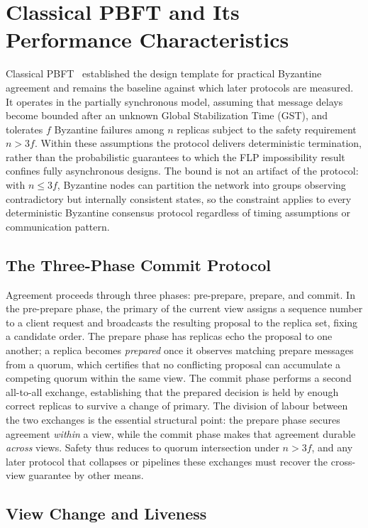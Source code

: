 \section{Classical PBFT and Its Performance Characteristics}

Classical PBFT~\cite{castro1999practical} established the design template for practical Byzantine agreement and remains the baseline against which later protocols are measured. It operates in the partially synchronous model, assuming that message delays become bounded after an unknown Global Stabilization Time (GST), and tolerates $f$ Byzantine failures among $n$ replicas subject to the safety requirement $n > 3f$. Within these assumptions the protocol delivers deterministic termination, rather than the probabilistic guarantees to which the FLP impossibility result confines fully asynchronous designs. The bound is not an artifact of the protocol: with $n \leq 3f$, Byzantine nodes can partition the network into groups observing contradictory but internally consistent states, so the constraint applies to every deterministic Byzantine consensus protocol regardless of timing assumptions or communication pattern.

\subsection{The Three-Phase Commit Protocol}

Agreement proceeds through three phases: pre-prepare, prepare, and commit. In the pre-prepare phase, the primary of the current view assigns a sequence number to a client request and broadcasts the resulting proposal to the replica set, fixing a candidate order. The prepare phase has replicas echo the proposal to one another; a replica becomes \emph{prepared} once it observes matching prepare messages from a quorum, which certifies that no conflicting proposal can accumulate a competing quorum within the same view. The commit phase performs a second all-to-all exchange, establishing that the prepared decision is held by enough correct replicas to survive a change of primary. The division of labour between the two exchanges is the essential structural point: the prepare phase secures agreement \emph{within} a view, while the commit phase makes that agreement durable \emph{across} views. Safety thus reduces to quorum intersection under $n > 3f$, and any later protocol that collapses or pipelines these exchanges must recover the cross-view guarantee by other means.

\subsection{View Change and Liveness}

